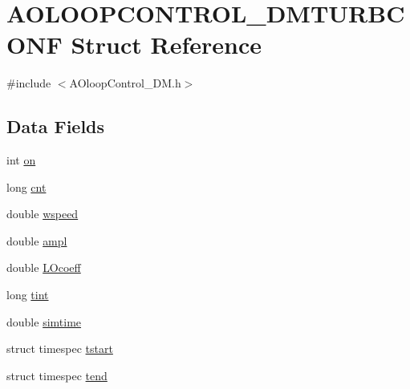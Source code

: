 \hypertarget{structAOLOOPCONTROL__DMTURBCONF}{\section{A\+O\+L\+O\+O\+P\+C\+O\+N\+T\+R\+O\+L\+\_\+\+D\+M\+T\+U\+R\+B\+C\+O\+N\+F Struct Reference}
\label{structAOLOOPCONTROL__DMTURBCONF}
}


{\ttfamily \#include $<$A\+Oloop\+Control\+\_\+\+D\+M.\+h$>$}

\subsection*{Data Fields}
\begin{DoxyCompactItemize}
\item 
int \hyperlink{structAOLOOPCONTROL__DMTURBCONF_afbceca5bf5d55347cabaf44b9e3fc834}{on}
\item 
long \hyperlink{structAOLOOPCONTROL__DMTURBCONF_afe27d92afe5a4006a00d45100a43cb14}{cnt}
\item 
double \hyperlink{structAOLOOPCONTROL__DMTURBCONF_aaac3d0a47b600f128ab17e8d066aa3a2}{wspeed}
\item 
double \hyperlink{structAOLOOPCONTROL__DMTURBCONF_a31e5bd8ebab2b23b811fd4a0b417161b}{ampl}
\item 
double \hyperlink{structAOLOOPCONTROL__DMTURBCONF_add3ae0ba50727441f0a838d998297d5e}{L\+Ocoeff}
\item 
long \hyperlink{structAOLOOPCONTROL__DMTURBCONF_a1d7cbe276afaf5c4de799e619abc3432}{tint}
\item 
double \hyperlink{structAOLOOPCONTROL__DMTURBCONF_aebfcb8b30daf186c5232f1559b3f704c}{simtime}
\item 
struct timespec \hyperlink{structAOLOOPCONTROL__DMTURBCONF_aab4485b269aa4f1908abc5f563585eef}{tstart}
\item 
struct timespec \hyperlink{structAOLOOPCONTROL__DMTURBCONF_a0fef3776d6168218244bb0ed1de2b4c9}{tend}
\end{DoxyCompactItemize}


